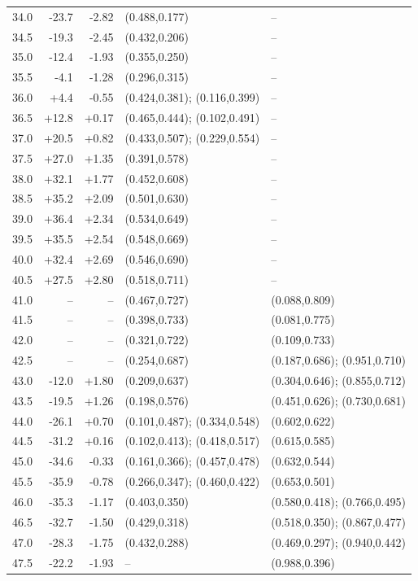 \documentclass[10pt,a4paper]{article}
\begin{document}
\begin{longtable}{@{}rrrp{55mm}p{55mm}@{}}
34.0 & -23.7 & -2.82 & (0.488,0.177) & --\\
34.5 & -19.3 & -2.45 & (0.432,0.206) & --\\
35.0 & -12.4 & -1.93 & (0.355,0.250) & --\\
35.5 & -4.1 & -1.28 & (0.296,0.315) & --\\
36.0 & +4.4 & -0.55 & (0.424,0.381); (0.116,0.399) & --\\
36.5 & +12.8 & +0.17 & (0.465,0.444); (0.102,0.491) & --\\
37.0 & +20.5 & +0.82 & (0.433,0.507); (0.229,0.554) & --\\
37.5 & +27.0 & +1.35 & (0.391,0.578) & --\\
38.0 & +32.1 & +1.77 & (0.452,0.608) & --\\
38.5 & +35.2 & +2.09 & (0.501,0.630) & --\\
39.0 & +36.4 & +2.34 & (0.534,0.649) & --\\
39.5 & +35.5 & +2.54 & (0.548,0.669) & --\\
40.0 & +32.4 & +2.69 & (0.546,0.690) & --\\
40.5 & +27.5 & +2.80 & (0.518,0.711) & --\\
41.0 & -- & -- & (0.467,0.727) & (0.088,0.809)\\
41.5 & -- & -- & (0.398,0.733) & (0.081,0.775)\\
42.0 & -- & -- & (0.321,0.722) & (0.109,0.733)\\
42.5 & -- & -- & (0.254,0.687) & (0.187,0.686); (0.951,0.710)\\
43.0 & -12.0 & +1.80 & (0.209,0.637) & (0.304,0.646); (0.855,0.712)\\
43.5 & -19.5 & +1.26 & (0.198,0.576) & (0.451,0.626); (0.730,0.681)\\
44.0 & -26.1 & +0.70 & (0.101,0.487); (0.334,0.548) & (0.602,0.622)\\
44.5 & -31.2 & +0.16 & (0.102,0.413); (0.418,0.517) & (0.615,0.585)\\
45.0 & -34.6 & -0.33 & (0.161,0.366); (0.457,0.478) & (0.632,0.544)\\
45.5 & -35.9 & -0.78 & (0.266,0.347); (0.460,0.422) & (0.653,0.501)\\
46.0 & -35.3 & -1.17 & (0.403,0.350) & (0.580,0.418); (0.766,0.495)\\
46.5 & -32.7 & -1.50 & (0.429,0.318) & (0.518,0.350); (0.867,0.477)\\
47.0 & -28.3 & -1.75 & (0.432,0.288) & (0.469,0.297); (0.940,0.442)\\
47.5 & -22.2 & -1.93 & -- & (0.988,0.396)\\

\end{longtable}
\end{document}
